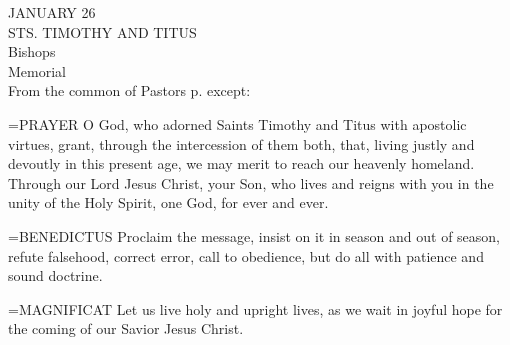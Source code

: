 \begin{center}\normalsize JANUARY 26\\
\footnotesize STS. TIMOTHY AND TITUS\\
\footnotesize Bishops\\
\footnotesize Memorial\\
\footnotesize From the common of Pastors p.   except:\\
\end{center}

\hangindent=\parindent \small{PRAYER 
O God, who adorned Saints Timothy and Titus
with apostolic virtues,
grant, through the intercession of them both,
that, living justly and devoutly in this present age,
we may merit to reach our heavenly homeland.
Through our Lord Jesus Christ, your Son,
who lives and reigns with you in the unity of the Holy Spirit,
one God, for ever and ever.\\}
 
\hangindent=\parindent \small{BENEDICTUS  Proclaim the message, insist on it in season and out of
season, refute falsehood, correct error, call to obedience, but do all
with patience and sound doctrine.\\}
 
\hangindent=\parindent \small{MAGNIFICAT  Let us live holy and upright lives, as we wait in joyful
hope for the coming of our Savior Jesus Christ.\\}
 
 

